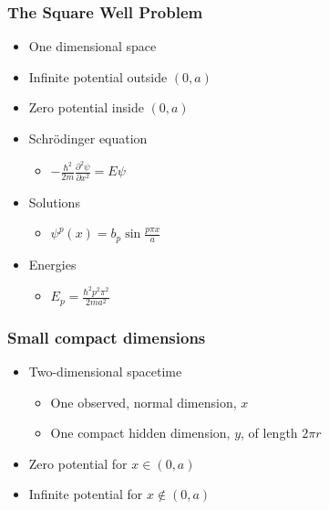 \documentclass{beamer}
\begin{document}
\begin{frame}
\frametitle{The Square Well Problem}
\begin{itemize}
\item{One dimensional space}
\item{Infinite potential outside $(0, a)$}
\item{Zero potential inside $(0, a)$}
\item{Schr\"{o}dinger equation}
\begin{itemize}
\item{ $-\frac{\hbar^2}{2m}\frac{\partial^2 \psi}{\partial x^2} = E\psi
$}
\end{itemize}
\item{Solutions}
\begin{itemize}
\item{ $\psi^p(x) = b_p \sin\frac{p\pi x} {a}$}
\end{itemize}
\item{Energies}
\begin{itemize}
\item{$E_p = \frac{\hbar^2 p^2 \pi^2}{2ma^2}$}
\end{itemize}
\end{itemize}
\end{frame}

\begin{frame}
\frametitle{Small compact dimensions}
\begin{itemize}
\item{Two-dimensional spacetime}
\begin{itemize}
\item{One observed, normal dimension, $x$}
\item{One compact hidden dimension, $y$, of length $2\pi r$}
\end{itemize}
\item{Zero potential for $x\in(0, a)$}
\item{Infinite potential for $x \notin (0, a)$}
\end{itemize}
\end{frame}
\end{document}
